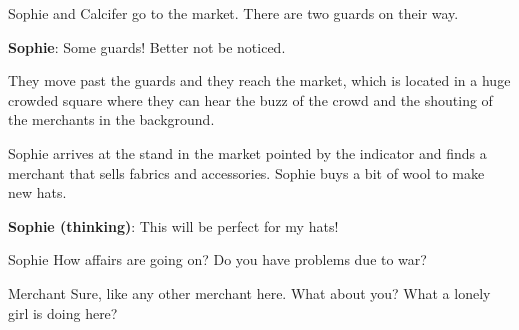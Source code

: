 Sophie and Calcifer go to the market. There are two guards on their way.

\textbf{Sophie}: Some guards! Better not be noticed.

They move past the guards and they reach the market, which is located in a huge crowded square where they can hear the buzz of the crowd and the shouting of the merchants in the background.


Sophie arrives at the stand in the market pointed by the indicator and finds a merchant that sells fabrics and accessories.
Sophie buys a bit of wool to make new hats.

\textbf{Sophie (thinking)}: This will be perfect for my hats!

\begin{screenplay}

\begin{dialogue}{Sophie}
How affairs are going on? Do you have problems due to war?
\end{dialogue}

\begin{dialogue}[resigned]{Merchant}
Sure, like any other merchant here. What about you? What a lonely girl is doing here?
\end{dialogue}

\end{screenplay}


